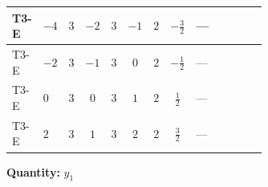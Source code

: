 \documentclass[8pt]{article}
\begin{document}
\begin{landscape}
\begin{longtable}{@{}llcccccc >{\raggedright\arraybackslash}p{0.21\linewidth} >{\raggedright\arraybackslash}p{0.21\linewidth} >{\raggedright\arraybackslash}p{0.21\linewidth}@{}}
\midrule
T3-E & $-4$ & $3$ & $-2$ & $3$ & $-1$ & $2$ & $-\frac{3}{2}$ & --- & \scriptsize\adjustbox{max width=\linewidth}{$\begin{gathered} -\frac{9}{2} {g_2}^2 \left({y_1}\right)_{ij}\end{gathered}$} & \scriptsize\adjustbox{max width=\linewidth}{$\begin{gathered} -\frac{15}{2} {g_1}^2 \left({y_1}\right)_{ij}\end{gathered}$} \\
\midrule
T3-E & $-2$ & $3$ & $-1$ & $3$ & $0$ & $2$ & $-\frac{1}{2}$ & --- & \scriptsize\adjustbox{max width=\linewidth}{$\begin{gathered} -\frac{9}{2} {g_2}^2 \left({y_1}\right)_{ij}\end{gathered}$} & \scriptsize\adjustbox{max width=\linewidth}{$\begin{gathered} -\frac{3}{2} {g_1}^2 \left({y_1}\right)_{ij}\end{gathered}$} \\
\midrule
T3-E & $0$ & $3$ & $0$ & $3$ & $1$ & $2$ & $\frac{1}{2}$ & --- & \scriptsize\adjustbox{max width=\linewidth}{$\begin{gathered} -\frac{9}{2} {g_2}^2 \left({y_1}\right)_{ij}\end{gathered}$} & \scriptsize\adjustbox{max width=\linewidth}{$\begin{gathered} -\frac{3}{2} {g_1}^2 \left({y_1}\right)_{ij}\end{gathered}$} \\
\midrule
T3-E & $2$ & $3$ & $1$ & $3$ & $2$ & $2$ & $\frac{3}{2}$ & --- & \scriptsize\adjustbox{max width=\linewidth}{$\begin{gathered} -\frac{9}{2} {g_2}^2 \left({y_1}\right)_{ij}\end{gathered}$} & \scriptsize\adjustbox{max width=\linewidth}{$\begin{gathered} -\frac{15}{2} {g_1}^2 \left({y_1}\right)_{ij}\end{gathered}$} \\
\midrule
\bottomrule
\end{longtable}
\clearpage
\noindent\textbf{Quantity: }$y_1$\par\smallskip

\end{landscape}
\end{document}
